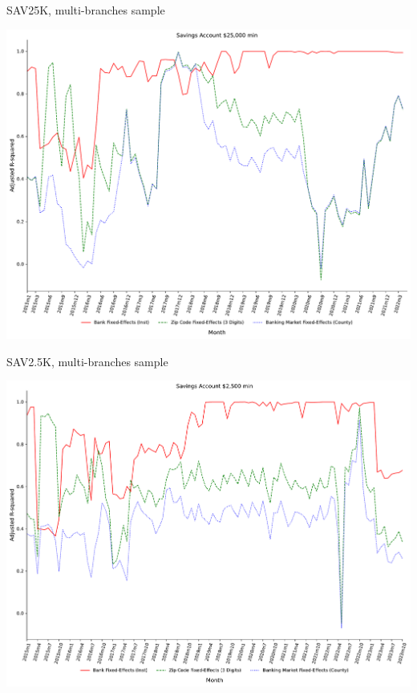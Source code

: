 \documentclass{beamer}
\begin{document}
\begin{frame}{SAV25K, multi-branches sample}
\begin{center}
\includegraphics[width=1\textwidth]{figure/multi_branch_sample_932466/3_fixed_effects_same_as_GP_wp/SAV25K_adjusted_R2_Rate_3_fixed_effects.pdf} 
\end{center}
\end{frame}


\begin{frame}{SAV2.5K, multi-branches sample}
\begin{center}
\includegraphics[width=1\textwidth]{figure/multi_branch_sample_932466/3_fixed_effects_same_as_GP_wp/SAV2_5K_adjusted_R2_Rate_3_fixed_effects.pdf} 
\end{center}
\end{frame}
\end{document}
